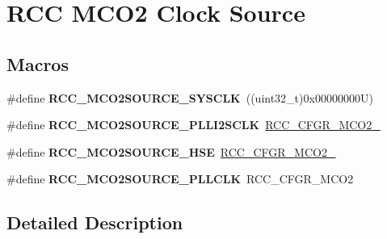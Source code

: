 \hypertarget{group___r_c_c___m_c_o2___clock___source}{}\section{R\+CC M\+C\+O2 Clock Source}
\label{group___r_c_c___m_c_o2___clock___source}
\subsection*{Macros}
\begin{DoxyCompactItemize}
\item 
\mbox{\label{group___r_c_c___m_c_o2___clock___source_ga54de4030872bb1307c7d7c8a3bd33131}} 
\#define {\bfseries R\+C\+C\+\_\+\+M\+C\+O2\+S\+O\+U\+R\+C\+E\+\_\+\+S\+Y\+S\+C\+LK}~((uint32\+\_\+t)0x00000000\+U)
\item 
\mbox{\label{group___r_c_c___m_c_o2___clock___source_ga02b34da36ca51681c7d5fb62d8f9b04b}} 
\#define {\bfseries R\+C\+C\+\_\+\+M\+C\+O2\+S\+O\+U\+R\+C\+E\+\_\+\+P\+L\+L\+I2\+S\+C\+LK}~\mbox{\hyperlink{group___peripheral___registers___bits___definition_ga203156a3f57e2c4498999c7901e0defd}{R\+C\+C\+\_\+\+C\+F\+G\+R\+\_\+\+M\+C\+O2\+\_}}
\item 
\mbox{\label{group___r_c_c___m_c_o2___clock___source_gade7c384e5e76c52d76b589297a8a6934}} 
\#define {\bfseries R\+C\+C\+\_\+\+M\+C\+O2\+S\+O\+U\+R\+C\+E\+\_\+\+H\+SE}~\mbox{\hyperlink{group___peripheral___registers___bits___definition_ga2fdba9682ff474255248f84e6851932a}{R\+C\+C\+\_\+\+C\+F\+G\+R\+\_\+\+M\+C\+O2\+\_}}
\item 
\mbox{\label{group___r_c_c___m_c_o2___clock___source_ga706e33338111d8ef82b00a54eba0215c}} 
\#define {\bfseries R\+C\+C\+\_\+\+M\+C\+O2\+S\+O\+U\+R\+C\+E\+\_\+\+P\+L\+L\+C\+LK}~R\+C\+C\+\_\+\+C\+F\+G\+R\+\_\+\+M\+C\+O2
\end{DoxyCompactItemize}


\subsection{Detailed Description}

